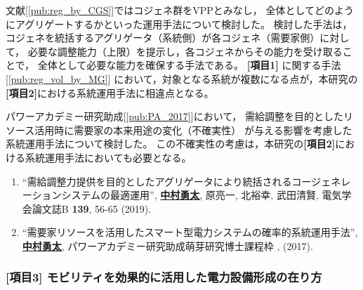 \documentclass[11pt,a4paper,uplatex,dvipdfmx]{ujarticle} 		%
\newcommand{\研究課題名}{モビリティの時空間調整を活用した電力設備形成構築}
\newcommand{\研究機関名}{名古屋工業大学}
\newcommand{\研究代表者氏名}{中村勇太}
\newcommand{\研究期間の最終元号年度}{10}  %
\newcommand{\paper}[6]{%
	\item ``#1'', #2, #3 {\bf #4}, #5 (#6).			%
}
\begin{document}
    文献[\ref{pub:reg_by_CGS}]ではコジェネ群をVPPとみなし，
	全体としてどのようにアグリゲートするかといった運用手法について検討した。
	検討した手法は，コジェネを統括するアグリゲータ（系統側）が各コジェネ（需要家側）に対して，
	必要な調整能力（上限）を提示し，各コジェネからその能力を受け取ることで，
	全体として必要な能力を確保する手法である。
	\textbf{[項目1]} に関する手法[\ref{pub:reg_vol_by_MG}]
	において，対象となる系統が複数になる点が，本研究の\textbf{[項目2]}における系統運用手法に相違点となる。%

	パワーアカデミー研究助成[\ref{pub:PA_2017}]において，
	需給調整を目的としたリソース活用時に需要家の本来用途の変化（不確実性）
	が与える影響を考慮した系統運用手法について検討した。
	この不確実性の考慮は，本研究の\textbf{[項目2]}における系統運用手法においても必要となる。

	\vspace{-0.5\baselineskip}           %
	\begin{enumerate}
		\setlength{\itemsep}{-5pt}

		\setcounter{enumi}{5}

		\paper{需給調整力提供を目的としたアグリゲータにより統括されるコージェネレーションシステムの最適運用}{\textbf{\ul{中村勇太}}, 原亮一, 北裕幸, 武田清賢}{電気学会論文誌B}{139}{56-65}{2019}\label{pub:reg_by_CGS}

		
		\paper{需要家リソースを活用したスマート型電力システムの確率的系統運用手法}{\textbf{\ul{中村勇太}}}{パワーアカデミー研究助成萌芽研究博士課程枠}{}{}{2017}\label{pub:PA_2017}
		

	\end{enumerate}


	\vspace{-1.5\baselineskip}           %
	\subsubsection*{\textbf{[項目3]} モビリティを効果的に活用した電力設備形成の在り方}
	\vspace{-0.5\baselineskip}           %
\end{document}
